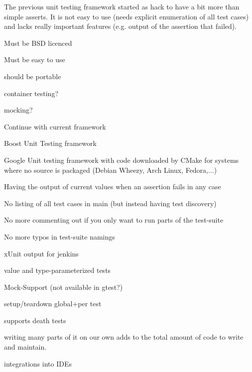 The previous unit testing framework started as hack to have a bit more than simple asserts. It is not easy to use (needs explicit enumeration of all test cases) and lacks really important features (e.\+g. output of the assertion that failed).


\begin{DoxyItemize}
\item Must be B\+SD licenced
\item Must be easy to use
\item should be portable
\item container testing?
\item mocking?
\end{DoxyItemize}


\begin{DoxyItemize}
\item Continue with current framework
\item Boost Unit Testing framework
\end{DoxyItemize}


\begin{DoxyItemize}
\item Google Unit testing framework with code downloaded by C\+Make for systems where no source is packaged (Debian Wheezy, Arch Linux, Fedora,...)
\end{DoxyItemize}


\begin{DoxyItemize}
\item Having the output of current values when an assertion fails in any case
\item No listing of all test cases in main (but instead having test discovery)
\item No more commenting out if you only want to run parts of the test-\/suite
\item No more typos in test-\/suite namings
\item x\+Unit output for jenkins
\item value and type-\/parameterized tests
\item Mock-\/\+Support (not available in gtest?)
\item setup/teardown global+per test
\item supports death tests
\item writing many parts of it on our own adds to the total amount of code to write and maintain.
\item integrations into I\+D\+Es
\end{DoxyItemize}


